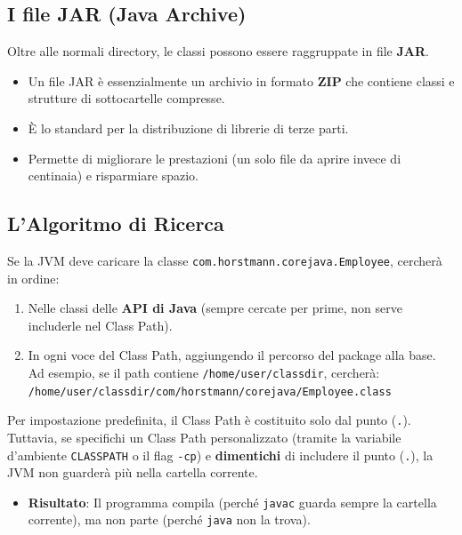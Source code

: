\subsection{I file JAR (Java Archive)}
Oltre alle normali directory, le classi possono essere raggruppate in file \textbf{JAR}.
\begin{itemize}
    \item Un file JAR è essenzialmente un archivio in formato \textbf{ZIP} che contiene classi e strutture di sottocartelle compresse.
    \item È lo standard per la distribuzione di librerie di terze parti.
    \item Permette di migliorare le prestazioni (un solo file da aprire invece di centinaia) e risparmiare spazio.
\end{itemize}

\subsection{L'Algoritmo di Ricerca}
Se la JVM deve caricare la classe \texttt{com.horstmann.corejava.Employee}, cercherà in ordine:
\begin{enumerate}
    \item Nelle classi delle \textbf{API di Java} (sempre cercate per prime, non serve includerle nel Class Path).
    \item In ogni voce del Class Path, aggiungendo il percorso del package alla base. Ad esempio, se il path contiene \texttt{/home/user/classdir}, cercherà: \\
    \texttt{/home/user/classdir/com/horstmann/corejava/Employee.class}
\end{enumerate}

\begin{caution}
    Per impostazione predefinita, il Class Path è costituito solo dal punto (\texttt{.}). Tuttavia, se specifichi un Class Path personalizzato (tramite la variabile d'ambiente \texttt{CLASSPATH} o il flag \texttt{-cp}) e \textbf{dimentichi} di includere il punto (\texttt{.}), la JVM non guarderà più nella cartella corrente.
    \begin{itemize}
        \item \textbf{Risultato}: Il programma compila (perché \texttt{javac} guarda sempre la cartella corrente), ma non parte (perché \texttt{java} non la trova).
    \end{itemize}
\end{caution}

